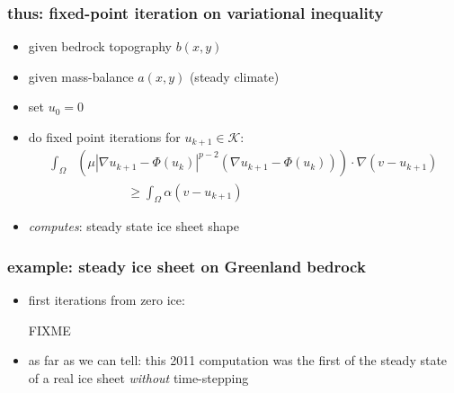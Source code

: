 \documentclass[hide notes,intlimits]{beamer}
\begin{document}
\begin{frame}
  \frametitle{thus: fixed-point iteration on variational inequality} 

\begin{itemize}
\item given bedrock topography $b(x,y)$
\item given mass-balance $a(x,y)$ (steady climate)
\item set $u_0 = 0$
\item do fixed point iterations for $u_{k+1} \in \mathcal{K}$:
\begin{align*}
\int_{\Omega} &\left( \mu |\nabla u_{k+1} - \Phi(u_k)|^{p-2}
(\nabla u_{k+1} - \Phi(u_k) ) \right) \cdot \nabla (v - u_{k+1}) \\
&\qquad\qquad \ge \int_{\Omega} \alpha (v -  u_{k+1})
\end{align*}

\bigskip
\item \emph{computes}: steady state ice sheet shape
\end{itemize}
\end{frame}


\begin{frame}
  \frametitle{example: steady ice sheet on Greenland bedrock}

\begin{itemize}
\item first iterations from zero ice:

\begin{center}
FIXME
\end{center}
\item as far as we can tell: this 2011 computation was the first of the steady state of a real ice sheet \emph{without} time-stepping
\end{itemize}
\end{frame}
\end{document}
